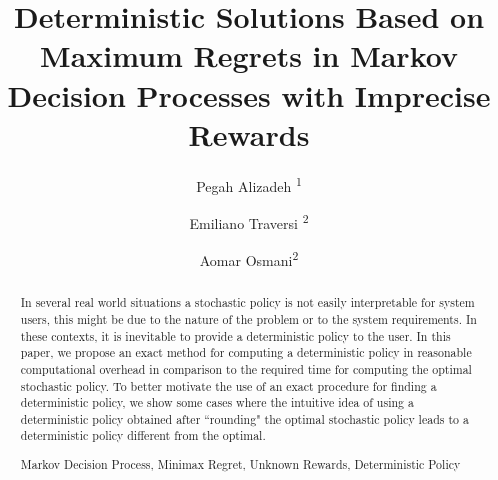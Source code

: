 \documentclass[runningheads,a4paper]{llncs}
\newcommand{\up}[1]{\textsuperscript{#1}}
\newcommand{\keywords}[1]{\par\addvspace\baselineskip
\noindent\keywordname\enspace\ignorespaces#1}
\begin{document}
\mainmatter  %

\title{Deterministic Solutions Based on Maximum Regrets in Markov Decision Processes with Imprecise Rewards}


%
%

\author{Pegah Alizadeh \up{1} \and Emiliano Traversi \up{2} \and Aomar Osmani\up{2}}

%



%
%

\maketitle


\begin{abstract}
In several real world situations a stochastic policy is not easily interpretable for system users, this might be due to the nature of the problem or to the system requirements. In these contexts, it is inevitable to provide a deterministic policy to the user. In this paper, we propose an exact method for computing a deterministic policy in reasonable computational overhead in comparison to the required time for computing the optimal stochastic policy. To better motivate the use of an exact procedure for finding a deterministic policy, we show some cases where the intuitive idea of using a deterministic policy obtained after ``rounding" the optimal stochastic policy leads to a deterministic policy different from the optimal.
\keywords{Markov Decision Process, Minimax Regret, Unknown Rewards, Deterministic Policy}
\end{abstract}
\end{document}
